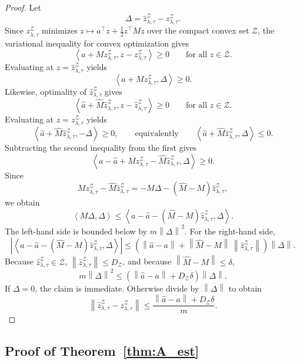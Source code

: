 \documentclass{article}
\newcommand{\cZ}{\mathcal{Z}}
\newcommand{\norm}[1]{\left\lVert #1 \right\rVert}
\newcommand{\abs}[1]{\left\lvert #1 \right\rvert}
\newcommand{\paren}[1]{\left( #1 \right)}
\newcommand{\ip}[2]{\left\langle #1, #2 \right\rangle}
\begin{document}
\begin{proof}
Let
\[
\Delta = \hat z_{\lambda,\tau}^{\cZ} - z_{\lambda,\tau}^{\cZ}.
\]
Since \(z_{\lambda,\tau}^{\cZ}\) minimizes \(z\mapsto a^\top z + \frac12 z^\top M z\) over the compact convex set \(\cZ\), the variational inequality for convex optimization gives
\[
\ip{a+Mz_{\lambda,\tau}^{\cZ}}{z-z_{\lambda,\tau}^{\cZ}} \ge 0
\qquad
\text{for all } z\in\cZ.
\]
Evaluating at \(z=\hat z_{\lambda,\tau}^{\cZ}\) yields
\[
\ip{a+Mz_{\lambda,\tau}^{\cZ}}{\Delta} \ge 0.
\]
Likewise, optimality of \(\hat z_{\lambda,\tau}^{\cZ}\) gives
\[
\ip{\hat a+\hat M\hat z_{\lambda,\tau}^{\cZ}}{z-\hat z_{\lambda,\tau}^{\cZ}} \ge 0
\qquad
\text{for all } z\in\cZ.
\]
Evaluating at \(z=z_{\lambda,\tau}^{\cZ}\) yields
\[
\ip{\hat a+\hat M\hat z_{\lambda,\tau}^{\cZ}}{-\Delta}\ge 0,
\qquad\text{equivalently}\qquad
\ip{\hat a+\hat M\hat z_{\lambda,\tau}^{\cZ}}{\Delta}\le 0.
\]
Subtracting the second inequality from the first gives
\[
\ip{a-\hat a + Mz_{\lambda,\tau}^{\cZ}-\hat M\hat z_{\lambda,\tau}^{\cZ}}{\Delta}\ge 0.
\]
Since
\[
Mz_{\lambda,\tau}^{\cZ}-\hat M\hat z_{\lambda,\tau}^{\cZ}
=
-M\Delta - (\hat M-M)\hat z_{\lambda,\tau}^{\cZ},
\]
we obtain
\[
\ip{M\Delta}{\Delta}
\le
\ip{a-\hat a - (\hat M-M)\hat z_{\lambda,\tau}^{\cZ}}{\Delta}.
\]
The left-hand side is bounded below by \(m\norm{\Delta}^2\). For the right-hand side,
\[
\abs{\ip{a-\hat a - (\hat M-M)\hat z_{\lambda,\tau}^{\cZ}}{\Delta}}
\le
\paren{\norm{\hat a-a} + \norm{\hat M-M}\,\norm{\hat z_{\lambda,\tau}^{\cZ}}}\norm{\Delta}.
\]
Because \(\hat z_{\lambda,\tau}^{\cZ}\in\cZ\), \(\norm{\hat z_{\lambda,\tau}^{\cZ}}\le D_\cZ\), and because \(\norm{\hat M-M}\le \delta\),
\[
m\norm{\Delta}^2
\le
\paren{\norm{\hat a-a} + D_\cZ\delta}\norm{\Delta}.
\]
If \(\Delta=0\), the claim is immediate. Otherwise divide by \(\norm{\Delta}\) to obtain
\[
\norm{\hat z_{\lambda,\tau}^{\cZ} - z_{\lambda,\tau}^{\cZ}}
\le
\frac{\norm{\hat a-a} + D_\cZ\delta}{m}.
\]
\end{proof}

\subsection{Proof of Theorem~\ref{thm:A_est}}
\end{document}
